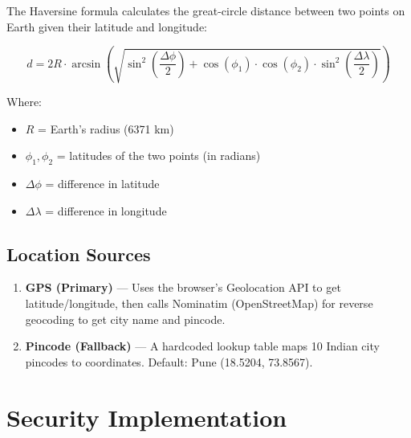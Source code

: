 \documentclass[12pt,a4paper]{article}
\begin{document}
The Haversine formula calculates the great-circle distance between two points on Earth given their latitude and longitude:

\[
d = 2R \cdot \arcsin\left(\sqrt{\sin^2\left(\frac{\Delta\phi}{2}\right) + \cos(\phi_1) \cdot \cos(\phi_2) \cdot \sin^2\left(\frac{\Delta\lambda}{2}\right)}\right)
\]

Where:
\begin{itemize}[leftmargin=*]
    \item $R$ = Earth's radius (6371 km)
    \item $\phi_1, \phi_2$ = latitudes of the two points (in radians)
    \item $\Delta\phi$ = difference in latitude
    \item $\Delta\lambda$ = difference in longitude
\end{itemize}

\subsection{Location Sources}

\begin{enumerate}[leftmargin=*]
    \item \textbf{GPS (Primary)} --- Uses the browser's Geolocation API to get latitude/longitude, then calls Nominatim (OpenStreetMap) for reverse geocoding to get city name and pincode.
    \item \textbf{Pincode (Fallback)} --- A hardcoded lookup table maps 10 Indian city pincodes to coordinates. Default: Pune (18.5204, 73.8567).
\end{enumerate}

\section{Security Implementation}
\end{document}
